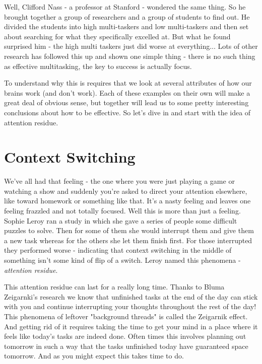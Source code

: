 \documentclass[11pt,a5paper]{book}
\begin{document}
Well, Clifford Nass - a professor at Stanford - wondered the same thing. So he brought together a group of researchers and a group of students to find out. He divided the students into high multi-taskers and low multi-taskers and then set about searching for what they specifically excelled at. But what he found surprised him - the high multi taskers just did worse at everything... Lots of other research has followed this up and shown one simple thing - there is no such thing as effective multitasking, the key to success is actually focus. \cite{keller}
\newline

To understand why this is requires that we look at several attributes of how our brains work (and don't work). Each of these examples on their own will make a great deal of obvious sense, but together will lead us to some pretty interesting conclusions about how to be effective. So let's dive in and start with the idea of attention residue.

\section{Context Switching}

We've all had that feeling - the one where you were just playing a game or watching a show and suddenly you're asked to direct your attention elsewhere, like toward homework or something like that. It's a nasty feeling and leaves one feeling frazzled and not totally focused. Well this is more than just a feeling. Sophie Leroy ran a study in which she gave a series of people some difficult puzzles to solve. Then for some of them she would interrupt them and give them a new task whereas for the others she let them finish first. For those interrupted they performed worse - indicating that context switching in the middle of something isn't some kind of flip of a switch. Leroy named this phenomena - \textit{attention residue}. 
\newline

This attention residue can last for a really long time. Thanks to Bluma Zeigarnki's research we know that unfinished tasks at the end of the day can stick with you and continue interrupting your thoughts throughout the rest of the day! This phenomena of leftover "background threads" is called the Zeigarnik effect. \cite{newport} And getting rid of it requires taking the time to get your mind in a place where it feels like today's tasks are indeed done. Often times this involves planning out tomorrow in such a way that the tasks unfinished today have guaranteed space tomorrow. And as you might expect this takes time to do. 
\newline
\end{document}
